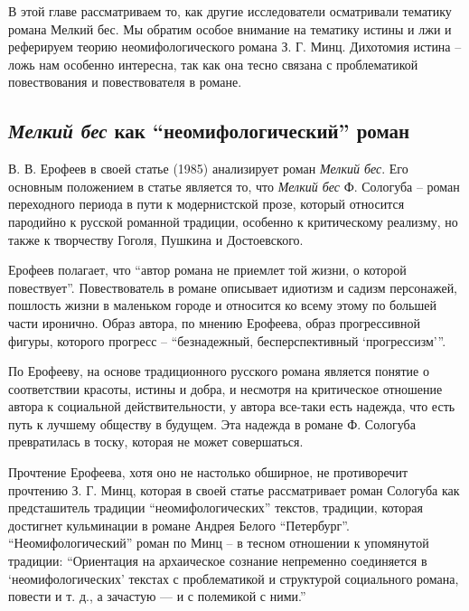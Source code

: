 \documentclass[12pt,a4paper]{article}
\begin{document}
В этой главе рассматриваем то, как другие исследователи осматривали тематику романа Мелкий бес. Мы обратим особое внимание на тематику истины и лжи и реферируем теорию неомифологического романа З. Г. Минц. Дихотомия истина – ложь нам особенно интересна, так как она тесно связана с проблематикой повествования и повествователя в романе.


\subsection{\emph{Мелкий бес} как \enquote{неомифологический} роман}

В. В. Ерофеев в своей статье  (1985) анализирует роман \emph{Мелкий бес}. Его основным положением в статье является то, что \emph{Мелкий бес} Ф. Сологуба -- роман переходного периода в пути к модернистской прозе, который относится пародийно к русской романной традиции, особенно к критическому реализму, но также к творчеству Гоголя, Пушкина и Достоевского. \parencite[145.]{jerofeev1985}


Ерофеев полагает, что \enquote{автор романа не приемлет той жизни, о которой повествует}. Повествователь в романе описывает идиотизм и садизм персонажей, пошлость жизни в маленьком городе и относится ко всему этому по большей части иронично. Образ автора, по мнению Ерофеева, образ прогрессивной фигуры, которого прогресс -- \enquote{безнадежный, бесперспективный \enquote{прогрессизм}}. \Parencite[146.]{jerofeev1985}


По Ерофееву, на основе традиционного русского романа является понятие о соответствии красоты, истины и добра, и несмотря на критическое отношение автора к социальной действительности, у автора все-таки есть надежда, что есть путь к лучшему обществу в будущем. Эта надежда в романе Ф. Сологуба превратилась в тоску, которая не может совершаться.  \parencite[158.]{jerofeev1985}



Прочтение Ерофеева, хотя оно не настолько обширное, не противоречит прочтению З. Г. Минц, которая в  своей статье  \parencite*{mints2004} рассматривает роман Сологуба как предсташитель традиции \enquote{неомифологических} текстов, традиции, которая достигнет кульминации в романе Андрея Белого \enquote{Петербург}. \enquote{Неомифологический} роман по Минц -- в тесном отношении к упомянутой традиции: \enquote{Ориентация на архаическое сознание непременно соединяется в \enquote{неомифологических} текстах с проблематикой и структурой социального романа, повести и т. д., а зачастую — и с полемикой с ними.} \Parencite[60.]{mints2004}
\end{document}
